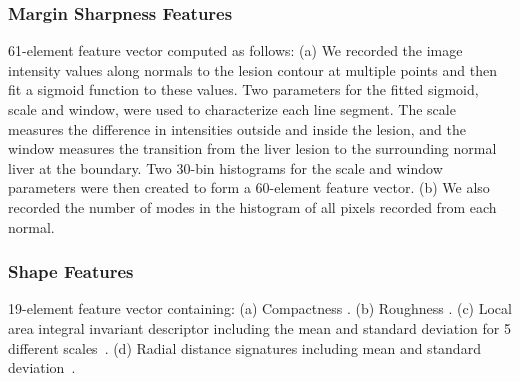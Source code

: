 \subsubsection{Margin Sharpness Features}
61-element feature vector computed as follows: (a) We recorded the image intensity values along normals to the lesion contour at multiple points and then fit a sigmoid function to these values.  Two parameters for the fitted sigmoid, scale and window, were used to characterize each line segment. The scale measures the difference in intensities outside and inside the lesion, and the window measures the transition from the liver lesion to the surrounding normal liver at the boundary. Two 30-bin histograms for the scale and window parameters were then created to form a 60-element feature vector. (b) We also recorded the number of modes in the histogram of all pixels recorded from each normal.

\subsubsection{Shape Features}
19-element feature vector containing: (a) Compactness \cite{Duda:1973ul}. (b) Roughness \cite{Kilday:1993jk}. (c) Local area integral invariant descriptor including the mean and standard deviation for 5 different scales~\cite{Hong:2006ti,Manay:2006un}. (d) Radial distance signatures including mean and standard deviation~\cite{MRangayyan:2005td}.

